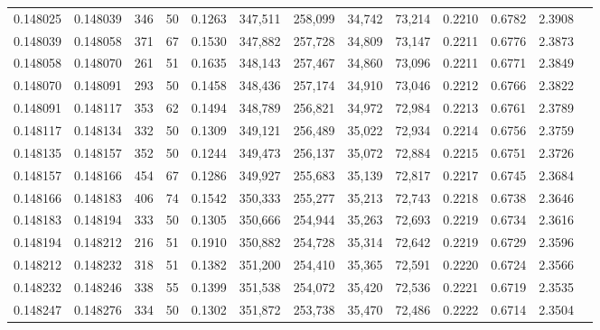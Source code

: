 \begin{tabular}{rrrrrrrrrrrrr}
0.148025 & 0.148039 &   346 &  50 &                                     0.1263 & 347,511 & 258,099 &  34,742 &  73,214 & 0.2210 & 0.6782 & 2.3908 \\
0.148039 & 0.148058 &   371 &  67 &                                     0.1530 & 347,882 & 257,728 &  34,809 &  73,147 & 0.2211 & 0.6776 & 2.3873 \\
0.148058 & 0.148070 &   261 &  51 &                                     0.1635 & 348,143 & 257,467 &  34,860 &  73,096 & 0.2211 & 0.6771 & 2.3849 \\
0.148070 & 0.148091 &   293 &  50 &                                     0.1458 & 348,436 & 257,174 &  34,910 &  73,046 & 0.2212 & 0.6766 & 2.3822 \\
0.148091 & 0.148117 &   353 &  62 &                                     0.1494 & 348,789 & 256,821 &  34,972 &  72,984 & 0.2213 & 0.6761 & 2.3789 \\
0.148117 & 0.148134 &   332 &  50 &                                     0.1309 & 349,121 & 256,489 &  35,022 &  72,934 & 0.2214 & 0.6756 & 2.3759 \\
0.148135 & 0.148157 &   352 &  50 &                                     0.1244 & 349,473 & 256,137 &  35,072 &  72,884 & 0.2215 & 0.6751 & 2.3726 \\
0.148157 & 0.148166 &   454 &  67 &                                     0.1286 & 349,927 & 255,683 &  35,139 &  72,817 & 0.2217 & 0.6745 & 2.3684 \\
0.148166 & 0.148183 &   406 &  74 &                                     0.1542 & 350,333 & 255,277 &  35,213 &  72,743 & 0.2218 & 0.6738 & 2.3646 \\
0.148183 & 0.148194 &   333 &  50 &                                     0.1305 & 350,666 & 254,944 &  35,263 &  72,693 & 0.2219 & 0.6734 & 2.3616 \\
0.148194 & 0.148212 &   216 &  51 &                                     0.1910 & 350,882 & 254,728 &  35,314 &  72,642 & 0.2219 & 0.6729 & 2.3596 \\
0.148212 & 0.148232 &   318 &  51 &                                     0.1382 & 351,200 & 254,410 &  35,365 &  72,591 & 0.2220 & 0.6724 & 2.3566 \\
0.148232 & 0.148246 &   338 &  55 &                                     0.1399 & 351,538 & 254,072 &  35,420 &  72,536 & 0.2221 & 0.6719 & 2.3535 \\
0.148247 & 0.148276 &   334 &  50 &                                     0.1302 & 351,872 & 253,738 &  35,470 &  72,486 & 0.2222 & 0.6714 & 2.3504 \\

\end{tabular}
